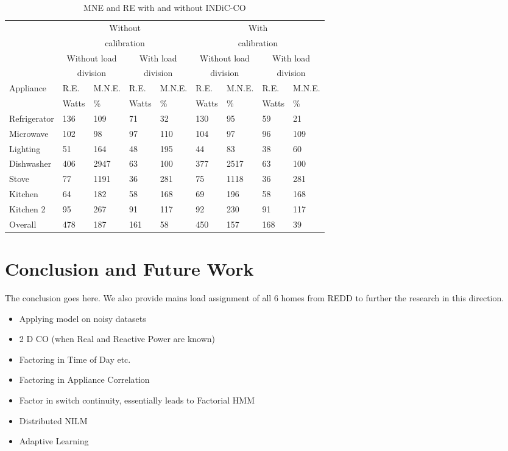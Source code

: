 \documentclass[conference]{IEEEtran}
\begin{document}
\begin{table}
\caption{MNE and RE with and without INDiC-CO}
\label{tab:results}
\begin{tabular}{|p{30pt}|p{12pt}|p{14pt}|p{12pt}|p{14pt}|p{12pt}|p{14pt}|p{12pt}|p{14pt}|}
\hline
&\multicolumn{4}{|c|}{Without}&\multicolumn{4}{|c|}{With}\\
&\multicolumn{4}{|c|}{calibration}&\multicolumn{4}{|c|}{calibration}\\
\hline
&\multicolumn{2}{|c|}{Without load}&\multicolumn{2}{|c|}{With load}&\multicolumn{2}{|c|}{Without load}&\multicolumn{2}{|c|}{With load}\\
&\multicolumn{2}{|c|}{division}&\multicolumn{2}{|c|}{division}&\multicolumn{2}{|c|}{division}&\multicolumn{2}{|c|}{division}\\
\hline

Appliance &R.E.&M.N.E.& R.E.&M.N.E.&R.E.&M.N.E.&R.E.& M.N.E.\\
&Watts&\%&Watts&\%&Watts&\%&Watts&\%\\
\hline
Refrigerator & 136 &109 & 71 & 32 & 130 &95  &59 &21\\
Microwave    & 102 &98  & 97 & 110& 104 &97  &96 &109\\
Lighting     & 51  &164 & 48 & 195& 44  &83  &38 &60\\
Dishwasher   & 406 &2947& 63 & 100& 377 &2517&63 &100\\
Stove        & 77  &1191& 36 & 281& 75  &1118&36 &281\\
Kitchen      & 64  &182 & 58 & 168& 69  &196 &58 &168\\
Kitchen 2    & 95  &267 & 91 & 117& 92  &230 &91 &117\\
\hline
Overall      &478  &187 &161 &  58& 450 &157 &168&39\\

\hline

\end{tabular}
\end{table}





\section{Conclusion and Future Work}
The conclusion goes here.
We also provide mains load assignment of all 6 homes from REDD to further the research in this direction.

\begin{itemize}

\item Applying model on noisy datasets
\item 2 D CO (when Real and Reactive Power are known)
\item Factoring in Time of Day etc.
\item Factoring in Appliance Correlation
\item Factor in switch continuity, essentially leads to Factorial HMM
\item Distributed NILM
\item Adaptive Learning
\end{itemize}
\end{document}
